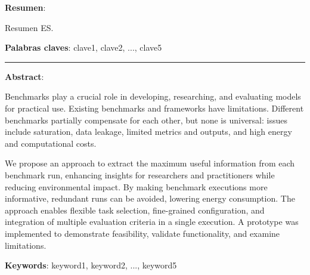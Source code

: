 \textbf{Resumen}:

Resumen ES.

\textbf{Palabras claves}: clave1, clave2, ..., clave5

\vspace{1cm}
\begin{center}
  \rule{0.5\textwidth}{.4pt}
\end{center}
\vspace{1cm}

\textbf{Abstract}:

Benchmarks play a crucial role in developing, researching, and evaluating models for practical use. Existing benchmarks and frameworks have limitations. Different benchmarks partially compensate for each other, but none is universal: issues include saturation, data leakage, limited metrics and outputs, and high energy and computational costs.



We propose an approach to extract the maximum useful information from each benchmark run, enhancing insights for researchers and practitioners while reducing environmental impact. By making benchmark executions more informative, redundant runs can be avoided, lowering energy consumption. The approach enables flexible task selection, fine-grained configuration, and integration of multiple evaluation criteria in a single execution. A prototype was implemented to demonstrate feasibility, validate functionality, and examine limitations.




\textbf{Keywords}: keyword1, keyword2, ..., keyword5
